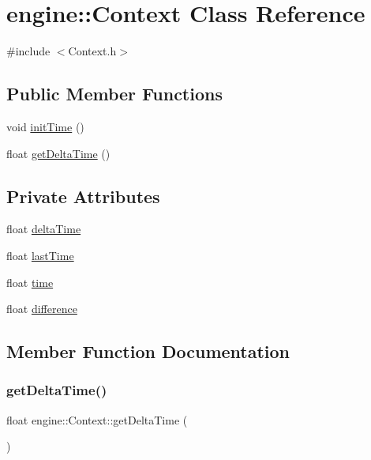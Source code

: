 \hypertarget{classengine_1_1_context}{}\section{engine\+:\+:Context Class Reference}
\label{classengine_1_1_context}


{\ttfamily \#include $<$Context.\+h$>$}

\subsection*{Public Member Functions}
\begin{DoxyCompactItemize}
\item 
void \mbox{\hyperlink{classengine_1_1_context_a9c76a55350ea6ad7c0f8a1fd77d3a246}{init\+Time}} ()
\item 
float \mbox{\hyperlink{classengine_1_1_context_a4b92544a5e4d3543bd901566b105094f}{get\+Delta\+Time}} ()
\end{DoxyCompactItemize}
\subsection*{Private Attributes}
\begin{DoxyCompactItemize}
\item 
float \mbox{\hyperlink{classengine_1_1_context_ae39fcd2cbc6f0fe9a190e9b59fb73a95}{delta\+Time}}
\item 
float \mbox{\hyperlink{classengine_1_1_context_aec676d76108e70d34838480af4b94f25}{last\+Time}}
\item 
float \mbox{\hyperlink{classengine_1_1_context_a9572fa6a13e407abd5a566b24309e4f1}{time}}
\item 
float \mbox{\hyperlink{classengine_1_1_context_a62265bfcb6a41c213c45c7335a48c4ff}{difference}}
\end{DoxyCompactItemize}


\subsection{Member Function Documentation}
\mbox{\label{classengine_1_1_context_a4b92544a5e4d3543bd901566b105094f}} 
\subsubsection{\texorpdfstring{get\+Delta\+Time()}{getDeltaTime()}}
{\footnotesize\ttfamily float engine\+::\+Context\+::get\+Delta\+Time (\begin{DoxyParamCaption}{ }\end{DoxyParamCaption})}

